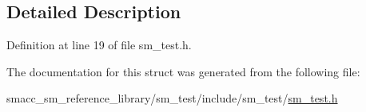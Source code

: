 \subsection{Detailed Description}


Definition at line 19 of file sm\+\_\+test.\+h.



The documentation for this struct was generated from the following file\+:\begin{DoxyCompactItemize}
\item 
smacc\+\_\+sm\+\_\+reference\+\_\+library/sm\+\_\+test/include/sm\+\_\+test/\hyperlink{sm__test_8h}{sm\+\_\+test.\+h}\end{DoxyCompactItemize}
